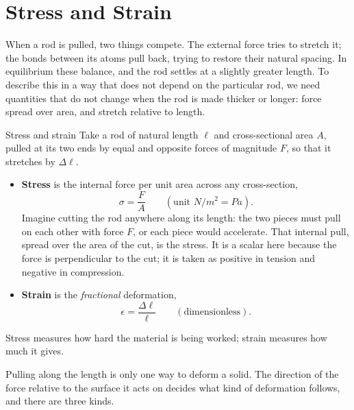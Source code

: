 \section{Stress and Strain}\label{sec:solids-stress}

When a rod is pulled, two things compete. The external force tries to stretch it; the bonds between its
atoms pull back, trying to restore their natural spacing. In equilibrium these balance, and the rod
settles at a slightly greater length. To describe this in a way that does not depend on the particular
rod, we need quantities that do not change when the rod is made thicker or longer: force spread over
area, and stretch relative to length.

\begin{defbox}{Stress and strain}
Take a rod of natural length $\ell$ and cross-sectional area $A$, pulled at its two ends by equal and
opposite forces of magnitude $F$, so that it stretches by $\Delta\ell$.
\begin{itemize}
\item \textbf{Stress} is the internal force per unit area across any cross-section,
      \[ \sigma=\frac{F}{A}\qquad(\text{unit }\si{N/m^2}=\si{Pa}). \]
      Imagine cutting the rod anywhere along its length: the two pieces must pull on each other with
      force $F$, or each piece would accelerate. That internal pull, spread over the area of the cut, is
      the stress. It is a scalar here because the force is perpendicular to the cut; it is taken as
      positive in tension and negative in compression.
\item \textbf{Strain} is the \emph{fractional} deformation,
      \[ \epsilon=\frac{\Delta\ell}{\ell}\qquad(\text{dimensionless}). \]
\end{itemize}
Stress measures how hard the material is being worked; strain measures how much it gives.
\end{defbox}


Pulling along the length is only one way to deform a solid. The direction of the force relative to the
surface it acts on decides what kind of deformation follows, and there are three kinds.


